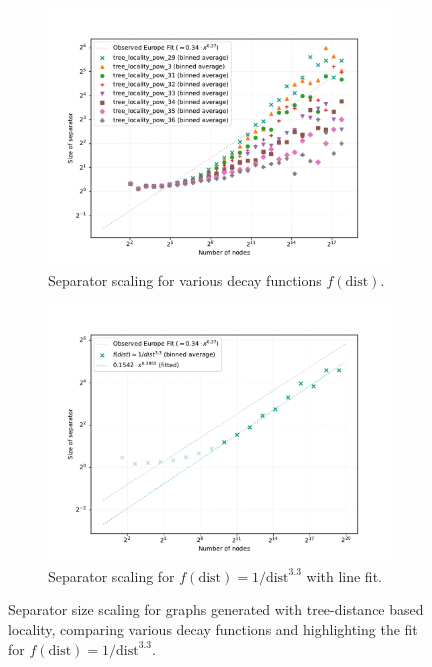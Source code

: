 \begin{figure}[tbhp]
	\centering
	\begin{subfigure}{0.45\linewidth}
		\centering
		\includegraphics[width=\linewidth]{graphics/tree_local_pow_overview.pdf}
		\caption{Separator scaling for various decay functions \(f(\text{dist})\).}
		\label{fig:tree_dist_compare_functions}
	\end{subfigure}
	\hfill
	\begin{subfigure}{0.45\linewidth}
		\centering
		\includegraphics[width=\linewidth]{graphics/tree_locality_33_1000000.pdf}
		\caption{Separator scaling for \(f(\text{dist}) = 1/\text{dist}^{3.3}\) with line fit.}
		\label{fig:tree_dist_best_fit_scaling}
	\end{subfigure}
	\caption{Separator size scaling for graphs generated with tree-distance based locality, comparing various decay functions and highlighting the fit for \(f(\text{dist}) = 1/\text{dist}^{3.3}\).}
	\label{fig:tree_dist_locality_scaling}
\end{figure}

